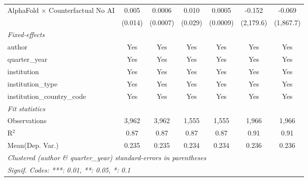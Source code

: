 \begin{tabular}{lcccccc}
   AlphaFold $\times$ Counterfactual No AI  & 0.005   & 0.0006   & 0.010   & 0.0005   & -0.152    & -0.069\\   
                                            & (0.014) & (0.0007) & (0.029) & (0.0009) & (2,179.6) & (1,867.7)\\   
   \midrule
   \emph{Fixed-effects}\\
   author                                   & Yes     & Yes      & Yes     & Yes      & Yes       & Yes\\  
   quarter\_year                            & Yes     & Yes      & Yes     & Yes      & Yes       & Yes\\  
   institution                              & Yes     & Yes      & Yes     & Yes      & Yes       & Yes\\  
   institution\_type                        & Yes     & Yes      & Yes     & Yes      & Yes       & Yes\\  
   institution\_country\_code               & Yes     & Yes      & Yes     & Yes      & Yes       & Yes\\  
   \midrule
   \emph{Fit statistics}\\
   Observations                             & 3,962   & 3,962    & 1,555   & 1,555    & 1,966     & 1,966\\  
   R$^2$                                    & 0.87    & 0.87     & 0.87    & 0.87     & 0.91      & 0.91\\  
Mean(Dep. Var.) & 0.235 & 0.235 & 0.234 & 0.234 & 0.236 & 0.236 \\
   \midrule \midrule
   \multicolumn{7}{l}{\emph{Clustered (author \& quarter\_year) standard-errors in parentheses}}\\
   \multicolumn{7}{l}{\emph{Signif. Codes: ***: 0.01, **: 0.05, *: 0.1}}\\
\end{tabular}
\par\endgroup
